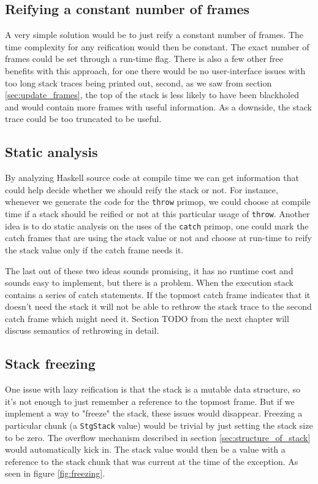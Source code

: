 \subsection{Reifying a constant number of frames}

A very simple solution would be to just reify a constant number of
frames. The time complexity for any reification would then be constant.
The exact number of frames could be set through a run-time flag. There
is also a few other free benefits with this approach, for one there
would be no user-interface issues with too long stack traces being
printed out, second, as we saw from section \ref{sec:update_frames},
the top of the stack is less likely to have been blackholed and would
contain more frames with useful information. As a downside, the stack
trace could be too truncated to be useful.

\subsection{Static analysis}

By analyzing Haskell source code at compile time we can get
information that could help decide whether we should reify the stack or
not. For instance, whenever we generate the code for the \texttt{throw}
primop, we could choose at compile time if a stack should be reified or
not at this particular usage of \texttt{throw}. Another idea is to do
static analysis on the uses of the \texttt{catch} primop, one could mark
the catch frames that are using the stack value or not and choose at
run-time to reify the stack value only if the catch frame needs it.

The last out of these two ideas sounds promising, it has no runtime cost
and sounds easy to implement, but there is a problem. When the execution
stack contains a series of catch statements. If the topmost catch frame
indicates that it doesn't need the stack it will not be able to rethrow
the stack trace to the second catch frame which might need it. Section
TODO from the next chapter will discuss semantics of rethrowing in
detail.

\subsection{Stack freezing}

One issue with lazy reification is that the stack is a mutable data
structure, so it's not enough to just remember a reference to the
topmost frame. But if we implement a way to "freeze" the stack, these
issues would disappear. Freezing a particular chunk (a \texttt{StgStack}
value) would be trivial by just setting the stack size to be zero. The
overflow mechanism described in section \ref{sec:structure_of_stack}
would automatically kick in. The stack value would then be a value with
a reference to the stack chunk that was current at the time of the
exception. As seen in figure \ref{fig:freezing}.

